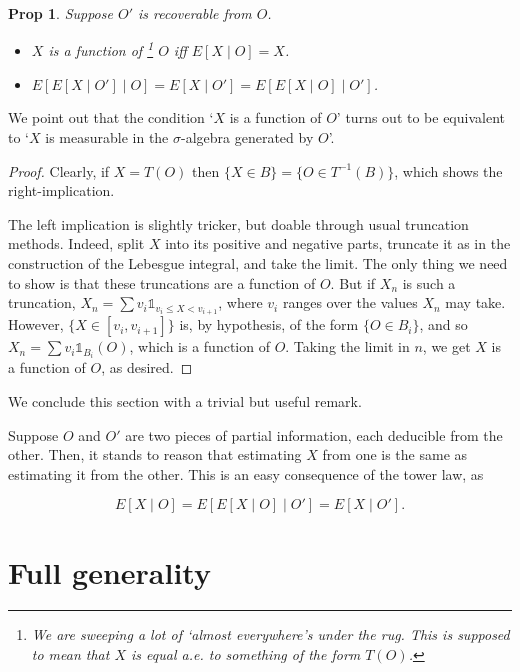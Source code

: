 \documentclass{article}
\let\mathbbalt\mathbb
\let\mathbbu\mathbb
\let\mathbb\mathbbalt
\newcommand{\ind}{\mathbbu{1}}
\newtheorem{prop}{Prop}
\begin{document}
	\begin{prop}
	Suppose $O'$ is recoverable from $O$.
	
	\begin{itemize}
	\item $X$ is a function of \footnote{We are sweeping a lot of `almost everywhere's under the rug. This is supposed to mean that $X$ is equal a.e. to something of the form $T(O)$.} $O$ iff $E[X \mid O] = X$.
	
	\item $E[E[X \mid O'] \mid O] = E[X \mid O'] = E[E[X \mid O] \mid O']$.
	\end{itemize}
	
	\end{prop}
	
	We point out that the condition `$X$ is a function of $O$' turns out to be equivalent to `$X$ is measurable in the $\sigma$-algebra generated by $O$'.
	
	\begin{proof}
	Clearly, if $X = T(O)$ then $\{X \in B\} = \{O \in T^{-1}(B)\}$, which shows the right-implication.
	
	The left implication is slightly tricker, but doable through usual truncation methods. Indeed, split $X$ into its positive and negative parts, truncate it as in the construction of the Lebesgue integral, and take the limit. The only thing we need to show is that these truncations are a function of $O$. But if $X_n$ is such a truncation, $X_n = \sum v_i \ind_{v_i \leq X < v_{i+1}}$, where $v_i$ ranges over the values $X_n$ may take. However, $\{X \in \left[v_i, v_{i+1}\right]\}$ is, by hypothesis, of the form $\{O \in B_i\}$, and so $X_n = \sum v_i \ind_{B_i}(O)$, which is a function of $O$. Taking the limit in $n$, we get $X$ is a function of $O$, as desired.
	\end{proof}
	
	We conclude this section with a trivial but useful remark.
	
	Suppose $O$ and $O'$ are two pieces of partial information, each deducible from the other. Then, it stands to reason that estimating $X$ from one is the same as estimating it from the other. This is an easy consequence of the tower law, as
	
	\[ E[X \mid O] = E[E[X \mid O] \mid O'] = E[X \mid O'].\]
	
	\section{Full generality}
	
\end{document}
